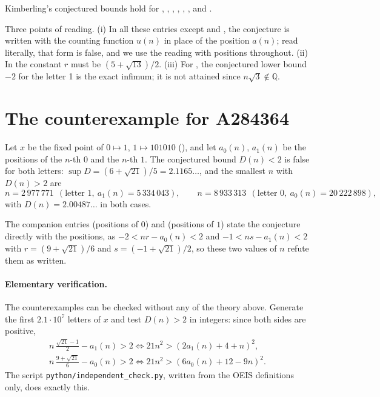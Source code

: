 \begin{corollary} Kimberling's conjectured bounds hold for , ,
, , , ,  and .
\end{corollary}

\begin{remark} Three points of reading. (i) In all these entries except  and
, the conjecture is written with the counting function $u(n)$ in place of the position
$a(n)$; read literally, that form is false, and we use the reading with positions throughout. (ii) In
 the constant $r$ must be $(5+\sqrt{13})/2$. (iii) For , the conjectured lower
bound $-2$ for the letter 1 is the exact infimum; it is not attained since $n\sqrt3\notin\mathbb{Q}$.
\end{remark}

\section{The counterexample for A284364}\label{s:counter}
\begin{theorem}\label{t:counter} Let $x$ be the fixed point of $0\mapsto 1$, $1\mapsto 101010$
(), and let $a_0(n)$, $a_1(n)$ be the positions of the $n$-th $0$ and the $n$-th $1$. The
conjectured bound $D(n)<2$ is false for both letters:
$\sup D=(6+\sqrt{21})/5=2.1165\ldots$, and the smallest $n$ with $D(n)>2$ are
\[ n=2\,977\,771\ \ (\text{letter }1,\ a_1(n)=5\,334\,043),\qquad
   n=8\,933\,313\ \ (\text{letter }0,\ a_0(n)=20\,222\,898), \]
with $D(n)=2.00487\ldots$ in both cases.\end{theorem}

The companion entries  (positions of $0$) and  (positions of $1$) state the
conjecture directly with the positions, as $-2<nr-a_0(n)<2$ and $-1<ns-a_1(n)<2$ with
$r=(9+\sqrt{21})/6$ and $s=(-1+\sqrt{21})/2$, so these two values of $n$ refute them as written.

\paragraph{Elementary verification.} The counterexamples can be checked without any of the theory above.
Generate the first $2.1\cdot10^7$ letters of $x$ and test $D(n)>2$ in integers: since both sides are
positive,
\begin{gather*} n\,\tfrac{\sqrt{21}-1}{2}-a_1(n)>2 \iff 21n^2>(2a_1(n)+4+n)^2,\\
   n\,\tfrac{9+\sqrt{21}}{6}-a_0(n)>2 \iff 21n^2>(6a_0(n)+12-9n)^2. \end{gather*}
The script \texttt{python/independent\_check.py}, written from the OEIS definitions only, does exactly this.

